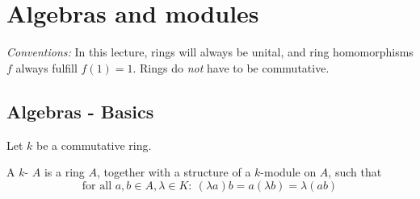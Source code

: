 \chapter{Algebras and modules}
\textit{Conventions:} In this lecture, rings will always be unital, and ring homomorphisms $f$ always fulfill $f(1)=1$. Rings do \textit{not} have to be commutative.
\section{Algebras - Basics}
Let $k$ be a commutative ring.
\begin{defn}
	A $k$- $A$ is a ring $A$, together with a structure of a $k$-module on $A$, such that
	\begin{equation}\label{1:comp}\tag{$\ast$}
		\text{for all }a,b\in A,\lambda \in K:~(\lambda a)b=a(\lambda b)= \lambda(ab)
	\end{equation}
\end{defn}

